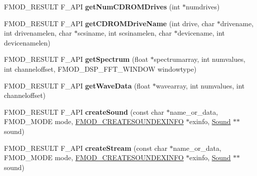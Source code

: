 \begin{DoxyCompactItemize}
\item 
\hypertarget{class_f_m_o_d_1_1_system_a0486b9577e9315bca170478ab27bae2f}{F\-M\-O\-D\-\_\-\-R\-E\-S\-U\-L\-T F\-\_\-\-A\-P\-I {\bfseries get\-Num\-C\-D\-R\-O\-M\-Drives} (int $\ast$numdrives)}\label{class_f_m_o_d_1_1_system_a0486b9577e9315bca170478ab27bae2f}

\item 
\hypertarget{class_f_m_o_d_1_1_system_a88d949c50355f054c2363b17b8723e72}{F\-M\-O\-D\-\_\-\-R\-E\-S\-U\-L\-T F\-\_\-\-A\-P\-I {\bfseries get\-C\-D\-R\-O\-M\-Drive\-Name} (int drive, char $\ast$drivename, int drivenamelen, char $\ast$scsiname, int scsinamelen, char $\ast$devicename, int devicenamelen)}\label{class_f_m_o_d_1_1_system_a88d949c50355f054c2363b17b8723e72}

\item 
\hypertarget{class_f_m_o_d_1_1_system_a6ce8950d031e5c213d85e9c9b04bc201}{F\-M\-O\-D\-\_\-\-R\-E\-S\-U\-L\-T F\-\_\-\-A\-P\-I {\bfseries get\-Spectrum} (float $\ast$spectrumarray, int numvalues, int channeloffset, F\-M\-O\-D\-\_\-\-D\-S\-P\-\_\-\-F\-F\-T\-\_\-\-W\-I\-N\-D\-O\-W windowtype)}\label{class_f_m_o_d_1_1_system_a6ce8950d031e5c213d85e9c9b04bc201}

\item 
\hypertarget{class_f_m_o_d_1_1_system_a5a28459b7c9b3d5023001ec5c96b2bf9}{F\-M\-O\-D\-\_\-\-R\-E\-S\-U\-L\-T F\-\_\-\-A\-P\-I {\bfseries get\-Wave\-Data} (float $\ast$wavearray, int numvalues, int channeloffset)}\label{class_f_m_o_d_1_1_system_a5a28459b7c9b3d5023001ec5c96b2bf9}

\item 
\hypertarget{class_f_m_o_d_1_1_system_aca0782c1d367a54ddf00aea484971735}{F\-M\-O\-D\-\_\-\-R\-E\-S\-U\-L\-T F\-\_\-\-A\-P\-I {\bfseries create\-Sound} (const char $\ast$name\-\_\-or\-\_\-data, F\-M\-O\-D\-\_\-\-M\-O\-D\-E mode, \hyperlink{struct_f_m_o_d___c_r_e_a_t_e_s_o_u_n_d_e_x_i_n_f_o}{F\-M\-O\-D\-\_\-\-C\-R\-E\-A\-T\-E\-S\-O\-U\-N\-D\-E\-X\-I\-N\-F\-O} $\ast$exinfo, \hyperlink{class_f_m_o_d_1_1_sound}{Sound} $\ast$$\ast$sound)}\label{class_f_m_o_d_1_1_system_aca0782c1d367a54ddf00aea484971735}

\item 
\hypertarget{class_f_m_o_d_1_1_system_accec6ee2c51fccf5091098658b65491c}{F\-M\-O\-D\-\_\-\-R\-E\-S\-U\-L\-T F\-\_\-\-A\-P\-I {\bfseries create\-Stream} (const char $\ast$name\-\_\-or\-\_\-data, F\-M\-O\-D\-\_\-\-M\-O\-D\-E mode, \hyperlink{struct_f_m_o_d___c_r_e_a_t_e_s_o_u_n_d_e_x_i_n_f_o}{F\-M\-O\-D\-\_\-\-C\-R\-E\-A\-T\-E\-S\-O\-U\-N\-D\-E\-X\-I\-N\-F\-O} $\ast$exinfo, \hyperlink{class_f_m_o_d_1_1_sound}{Sound} $\ast$$\ast$sound)}\label{class_f_m_o_d_1_1_system_accec6ee2c51fccf5091098658b65491c}


\end{DoxyCompactItemize}

